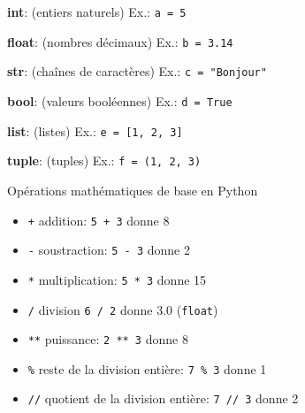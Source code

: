 \def\level{Première}  %
\def\course{NSI}
\def\chaptername{Constructions élémentaires} %
\def\docname{AP01-S}        %

\pagestyle{cours_FP}
\makeheader{} %

\begin{definition}{}


\begin{itemize}

   \begin{minipage}{0.48\linewidth}
      \item \textbf{int}: (entiers naturels) Ex.: \texttt{a = 5}
      \item \textbf{float}: (nombres décimaux) Ex.: \texttt{b = 3.14}
      \item \textbf{str}: (chaînes de caractères) Ex.: \texttt{c = "Bonjour"}
   \end{minipage}\hfill{}
   \begin{minipage}{0.48\linewidth}
      \item \textbf{bool}: (valeurs booléennes) Ex.: \texttt{d = True}
      \item \textbf{list}: (listes) Ex.: \texttt{e = [1, 2, 3]}
      \item \textbf{tuple}: (tuples) Ex.: \texttt{f = (1, 2, 3)}
      
   \end{minipage}
   \end{itemize}

\end{definition}

\begin{easybox}{Opérations mathématiques de base en Python}{}
	\begin{minipage}{0.43\linewidth}
		\begin{itemize}[]
        \item[] \texttt{+} \quad  addition:  \verb~5 + 3~ donne 8
        \item[] \texttt{-} \quad  soustraction: \verb~5 - 3~ donne 2
        \item[] \texttt{*} \quad  multiplication: \verb~5 * 3~ donne 15
        \item[] \texttt{/} \quad  division \verb~6 / 2~ donne 3.0 (\texttt{float})
\end{itemize}
	\end{minipage}\hfill{}
	\begin{minipage}{0.55\linewidth}
\begin{itemize}[]
        \item[] \texttt{**} \quad  puissance: \verb~2 ** 3~ donne 8
        \item[] \texttt{\%} \quad  reste de la division entière: \texttt{7 \% 3} donne 1
        \item[] \texttt{//} \quad  quotient de la division entière: \texttt{7 // 3} donne 2
    \end{itemize}
	\end{minipage}
\end{easybox}


